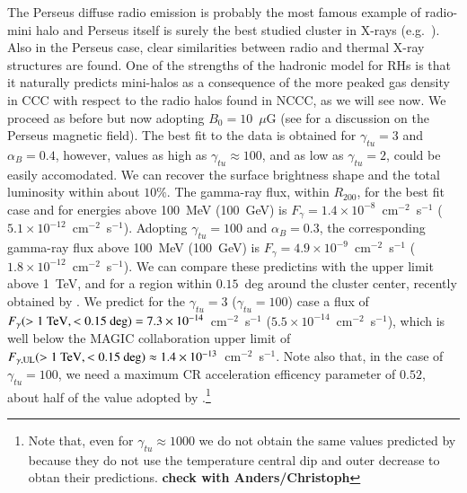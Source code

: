 \documentclass[traditabstract]{aa}
\begin{document}
The Perseus diffuse radio emission is probably the most famous example of radio-mini halo \citep{1990MNRAS.246..477P} and Perseus itself is surely the best studied cluster in X-rays (e.g.~\citealp{2003ApJ...590..225C,2006MNRAS.366..417F,2011arXiv1105.5025F}). Also in the Perseus case, clear similarities between radio and thermal X-ray structures are found. One of the strengths of the hadronic model for RHs is that it naturally predicts mini-halos as a consequence of the more peaked gas density in CCC with respect to the radio halos found in NCCC, as we will see now. 
We proceed as before but now adopting $B_{0}=10$~$\mu$G (see \citealp{2010ApJ...710..634A,2011arXiv1111.5544M} for a discussion on the Perseus magnetic field). 
The best fit to the data is obtained for $\gamma_{tu}=3$ and $\alpha_B=0.4$, however, values as high as $\gamma_{tu} \approx 100$, and as low as $\gamma_{tu}=2$, could be easily accomodated. We can recover the surface brightness shape and the total luminosity within about $10\%$. The gamma-ray flux, within $R_{200}$, for the best fit case and for energies above 100~MeV (100~GeV) is $F_{\gamma} = 1.4 \times 10^{-8}$~cm$^{-2}$~s$^{-1}$ ($5.1 \times 10^{-12}$~cm$^{-2}$~s$^{-1}$). Adopting $\gamma_{tu}=100$ and $\alpha_B=0.3$, the corresponding gamma-ray flux above 100~MeV (100~GeV) is $F_{\gamma} = 4.9 \times 10^{-9}$~cm$^{-2}$~s$^{-1}$ ($1.8 \times 10^{-12}$~cm$^{-2}$~s$^{-1}$). We can compare these predictins with the upper limit above 1~TeV, and for a region within $0.15$~deg around the cluster center, recently obtained by \cite{2011arXiv1111.5544M}. We predict for the $\gamma_{tu}=3$ ($\gamma_{tu}=100$) case a flux of $F_{\gamma}(>1~\rm{TeV},<0.15~\rm{deg}) = 7.3 \times 10^{-14}$~cm$^{-2}$~s$^{-1}$ ($5.5 \times 10^{-14}$~cm$^{-2}$~s$^{-1}$), which is well below the MAGIC collaboration upper limit of $F_{\gamma,\rm{UL}}(>1~\rm{TeV},<0.15~\rm{deg}) \approx 1.4 \times 10^{-13}$~cm$^{-2}$~s$^{-1}$. Note also that, in the case of $\gamma_{tu} = 100$, we need a maximum CR acceleration efficency parameter of $0.52$, about half of the value adopted by \cite{2010MNRAS.409..449P}.\footnote[14]{Note that, even for $\gamma_{tu} \approx 1000$ we do not obtain the same values predicted by \cite{2010MNRAS.409..449P} because they do not use the temperature central dip and outer decrease to obtan their predictions. {\bf check with Anders/Christoph}}
\end{document}
